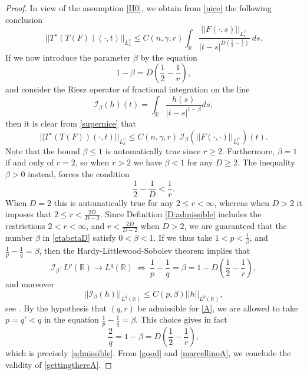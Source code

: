\documentclass[11pt,letter]{amsart}
\def \R {\mathbb{R}}
\numberwithin{equation}{section}
\numberwithin{equation}{section}
\begin{document}
\begin{proof}
In view of the assumption \eqref{H0}, we obtain from \eqref{nice} the following conclusion
\begin{equation}\label{supernice}
||T^\star(T(F))(\cdot,t)||_{L^r_x} \le C(n,\gamma,r) \int_\R \frac{||F(\cdot,s)||_{L^{r'}_x}}{|t-s|^{D\left(\frac 12-\frac 1r\right)}}\  ds. 
\end{equation}
If we now introduce the parameter $\beta$ by the equation
\begin{equation}\label{etabetaD}
1-\beta = D(\frac 12-\frac{1}{r}),
\end{equation}
and consider the Riesz operator of fractional integration on the line
\[
\mathcal I_\beta(h)(t) = \int_{\R} \frac{h(s)}{|t-s|^{1-\beta}} ds,
\]
then it is clear from \eqref{supernice} that 
\begin{equation}\label{good}
||T^\star(T(F))(\cdot,t)||_{L^r_x} \le C(n,\gamma,r)\ \mathcal I_\beta(||F(\cdot,\cdot)||_{L^{r'}_x})(t).
\end{equation}
Note that the bound $\beta\le 1$ is automatically true since $r\ge 2$. Furthermore, $\beta = 1$ if and only of $r=2$, so when $r>2$ we have $\beta < 1$ for any $D\ge 2$. The inequality $\beta >0$ instead, forces the condition 
\begin{equation}\label{derange}
\frac 12-\frac{1}{D}  < \frac 1r.
\end{equation}
When $D=2$ this is automatically true for any $2\le r < \infty$, whereas when $D>2$ it imposes that $2\le r < \frac{2D}{D-2}$. Since Definition \ref{D:admissible} includes the restrictions $2<r<\infty$, and $r< \frac{2D}{D-2}$ when $D>2$, we are guaranteed that the number $\beta$ in \eqref{etabetaD} satisfy $0<\beta<1$. If we thus take $1<p<\frac{1}\beta$, and $\frac 1p - \frac 1q = \beta$, then the Hardy-Littlewood-Sobolev theorem implies that
\begin{equation}\label{HLSA}
\mathcal I_\beta : L^p(\R)\to L^q(\R)\ \Longleftrightarrow\ \frac 1p - \frac 1q = \beta = 1 - D(\frac 12-\frac{1}{r}),
\end{equation}
and moreover
\begin{equation}\label{marcellinoA}
||\mathcal I_\beta(h)||_{L^q(\R)} \le C(p,\beta) ||h||_{L^p(\R)},
\end{equation}
see \cite[Theor. 1, p. 119]{St}. 
By the hypothesis that $(q,r)$ be admissible for \eqref{A}, we are allowed to take $p = q'<q$ in the equation $\frac 1p - \frac 1q = \beta$. This choice gives in fact
\[
\frac 2q = 1 - \beta = D(\frac 12-\frac{1}{r}),
\]
which is precisely \eqref{admissible}. From \eqref{good} and \eqref{marcellinoA}, we conclude the validity of \eqref{gettingthereA}.

\end{proof}
\end{document}
